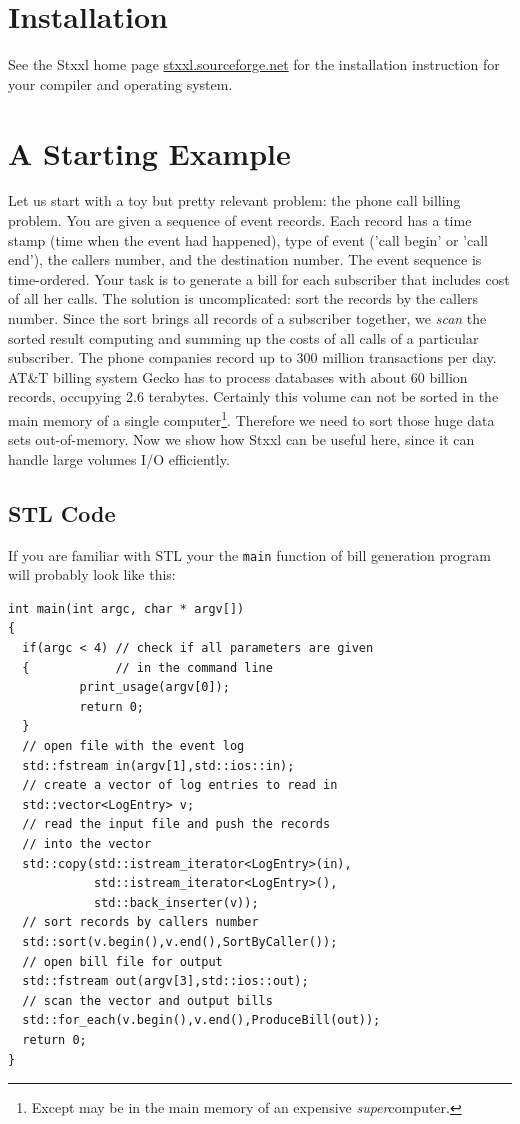 \documentclass[twoside]{book}
\newcommand{\stxxl}{{\sc Stxxl} }
\begin{document}
\chapter{Installation}

See the \stxxl home page \url{stxxl.sourceforge.net} for the installation
instruction for your compiler and operating system.


\chapter{A Starting Example}

Let us start with a toy but pretty relevant problem: the phone
call billing problem. You are given a sequence of event
records. Each record has a time stamp (time when the event had
happened), type of event ('call begin' or 'call end'), the callers
number, and the destination number. The event sequence is
time-ordered. Your task is to generate a bill for each subscriber
that includes cost of all her calls. The solution is uncomplicated:
sort the records by the callers number. Since the sort brings all records
of a subscriber together, we \emph{scan} the sorted result computing
and summing up the costs of all calls of a particular subscriber.
The phone companies record up to 300 million transactions per
day. AT\&T billing system Gecko \cite{BillingLarge} has to 
process databases with about 60 billion records, occupying 2.6
terabytes. Certainly this volume can not be sorted in the main memory
of a single computer\footnote{Except may be in the main memory of an
expensive \emph{super}computer.}. 
Therefore we need to sort those huge data sets out-of-memory. Now
we show how \stxxl can be useful here, since it can handle large
volumes I/O efficiently. 

\section{STL Code}
If you are familiar with STL your the {\tt main} function of bill
generation program will probably look like this:

\begin{lstlisting}
int main(int argc, char * argv[])
{
  if(argc < 4) // check if all parameters are given 
  {            // in the command line
          print_usage(argv[0]);
          return 0;
  }
  // open file with the event log
  std::fstream in(argv[1],std::ios::in);
  // create a vector of log entries to read in
  std::vector<LogEntry> v;
  // read the input file and push the records
  // into the vector
  std::copy(std::istream_iterator<LogEntry>(in),
            std::istream_iterator<LogEntry>(),
            std::back_inserter(v));
  // sort records by callers number
  std::sort(v.begin(),v.end(),SortByCaller());
  // open bill file for output
  std::fstream out(argv[3],std::ios::out);
  // scan the vector and output bills
  std::for_each(v.begin(),v.end(),ProduceBill(out));
  return 0;
}
\end{lstlisting}
\end{document}
